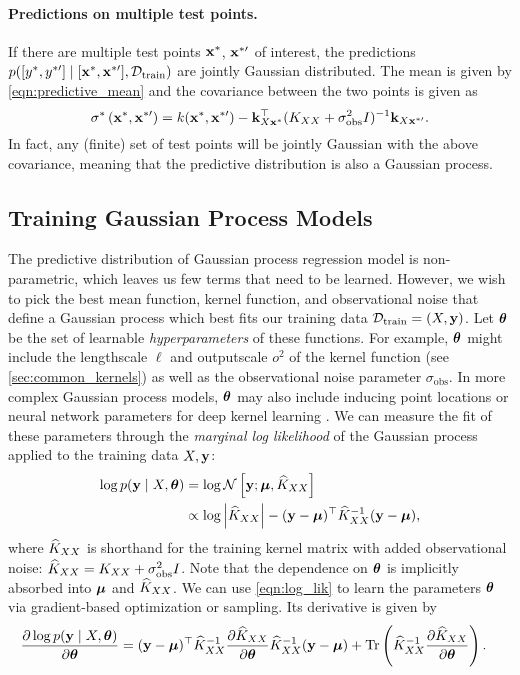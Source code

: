 \paragraph{Predictions on multiple test points.}
If there are multiple test points $\mathbf{x}^*$, $\mathbf{x}^{*\prime}$ of interest, the predictions $p([y^*, y^{*\prime}] \mid [\mathbf{x}^*, \mathbf{x}^{*\prime}], \mathcal D_\text{train})$ are jointly Gaussian distributed.
The mean is given by \cref{eqn:predictive_mean} and the covariance between the two points is given as
\[ \sigma^* \left( \mathbf{x}^*, \mathbf{x}^{*\prime} \right) = k(\mathbf{x}^*, \mathbf{x}^{*\prime}) - \mathbf{k}_{X\mathbf{x}^*}^\top ( K_{XX} + \sigma_\text{obs}^2 I )^{-1} \mathbf{k}_{X\mathbf{x}^{*\prime}}. \]
In fact, any (finite) set of test points will be jointly Gaussian with the above covariance, meaning that the predictive distribution is also a Gaussian process.

\subsection{Training Gaussian Process Models}

The predictive distribution of Gaussian process regression model is non-parametric, which leaves us few terms that need to be learned.
However, we wish to pick the best mean function, kernel function, and observational noise that define a Gaussian process which best fits our training data $\mathcal D_\text{train} = (X, \mathbf{y})$.
Let $\boldsymbol{\theta}$ be the set of learnable \emph{hyperparameters} of these functions.
For example, $\boldsymbol{\theta}$ might include the lengthscale $\ell$ and outputscale $o^2$ of the kernel function (see \cref{sec:common_kernels}) as well as the observational noise parameter $\sigma_\text{obs}$.
In more complex Gaussian process models, $\boldsymbol{\theta}$ may also include inducing point locations \cite{titsias2009variational} or neural network parameters for deep kernel learning \cite{wilson2016deep}.
We can measure the fit of these parameters through the \emph{marginal log likelihood} of the Gaussian process applied to the training data $X, \mathbf{y}$:
%
\begin{align}
  \log p( \mathbf{y} \mid X, \boldsymbol{\theta})
  &= \log \mathcal{N} \left[  \mathbf{y} ; \boldsymbol{\mu} ,  \widehat{K}_{XX}  \right]
  \nonumber{} \\
  &\propto \log \left\vert \widehat{K}_{XX} \right\vert - (\mathbf{y} - \boldsymbol{\mu})^{\top} \widehat{K}_{XX}^{-1} (\mathbf{y} - \boldsymbol{\mu}),
  \label{eqn:log_lik}
\end{align}
%
where $\widehat{K}_{XX}$ is shorthand for the training kernel matrix with added observational noise: $\widehat{K}_{XX} = K_{XX} + \sigma_\text{obs}^2 I$.
Note that the dependence on $\boldsymbol{\theta}$ is implicitly absorbed into $\boldsymbol{\mu}$ and $\widehat{K}_{XX}$.
We can use \cref{eqn:log_lik} to learn the parameters $\boldsymbol{\theta}$ via gradient-based optimization or sampling.
Its derivative is given by
%
\begin{align}
  \frac{\partial \log p( \by \mid \bX, \btheta )}{\partial \btheta} &= (\by - \bmu)^{\top} \trainK^{-1}\frac{\partial \trainK}{\partial \btheta}\trainK^{-1} (\by - \bmu)
  + \tr{\trainK^{-1}\frac{\partial \trainK}{\partial \btheta}}.
  \label{eq:log_lik_deriv}
\end{align}

